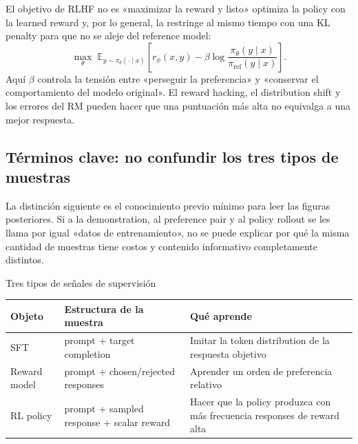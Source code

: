 
\begin{importantbox}{El objetivo de RLHF no es «maximizar la reward y listo»}
 optimiza la policy con la learned reward y, por lo general, la restringe al mismo tiempo con una KL penalty para que no se aleje del reference model:
\[
\max_{\theta}\;\mathbb{E}_{y\sim\pi_{\theta}(\cdot\mid x)}
\left[r_{\phi}(x,y)-\beta\log\frac{\pi_{\theta}(y\mid x)}{\pi_{\mathrm{ref}}(y\mid x)}\right].
\]
Aquí $\beta$ controla la tensión entre «perseguir la preferencia» y «conservar el comportamiento del modelo original». El reward hacking, el distribution shift y los errores del RM pueden hacer que una puntuación más alta no equivalga a una mejor respuesta.
\end{importantbox}


\subsection{Términos clave: no confundir los tres tipos de muestras}

La distinción siguiente es el conocimiento previo mínimo para leer las figuras posteriores. Si a la demonstration, al preference pair y al policy rollout se les llama por igual «datos de entrenamiento», no se puede explicar por qué la misma cantidad de muestras tiene costos y contenido informativo completamente distintos.

\begin{knowledgebox}{Tres tipos de señales de supervisión}
\begin{tabularx}{\textwidth}{@{}L{0.18\textwidth}L{0.25\textwidth}X@{}}
\toprule
Objeto & Estructura de la muestra & Qué aprende \\
\midrule
SFT & prompt + target completion & Imitar la token distribution de la respuesta objetivo \\
Reward model & prompt + chosen/rejected responses & Aprender un orden de preferencia relativo \\
RL policy & prompt + sampled response + scalar reward & Hacer que la policy produzca con más frecuencia responses de reward alta \\
\bottomrule
\end{tabularx}
\end{knowledgebox}

